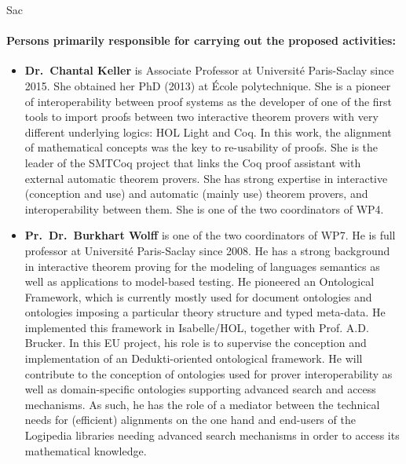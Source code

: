 \begin{sitedescription}{Sac}
\paragraph{Persons primarily responsible for carrying out the proposed
  activities:}

\begin{itemize} %

\item {\bf Dr.\ Chantal Keller} is Associate Professor at Université
  Paris-Saclay since 2015. She obtained her PhD (2013) at École
  polytechnique. She is a pioneer of interoperability between proof
  systems as the developer of one of the first tools to import proofs
  between two interactive theorem provers with very different underlying
  logics: HOL Light and Coq. In this work, the alignment of mathematical
  concepts was the key to re-usability of proofs. She is the leader of
  the SMTCoq project that links the Coq proof assistant with external
  automatic theorem provers. She has strong expertise in interactive
  (conception and use) and automatic (mainly use) theorem provers, and
  interoperability between them. She is one of the two coordinators of
  WP4.

\item {\bf Pr.\ Dr.\ Burkhart Wolff} is one of the two coordinators
  of WP7. He is full professor at Université Paris-Saclay since 2008.
  He has a strong background in interactive theorem proving for the modeling of 
  languages semantics as well as applications to model-based testing.
  He pioneered an Ontological Framework, which is currently mostly used for document
  ontologies and ontologies imposing a particular theory structure
  and typed meta-data. He implemented this framework in Isabelle/HOL, together
  with Prof. A.D. Brucker. In this EU project, his role is to supervise 
  the conception and implementation of an Dedukti-oriented ontological framework.
  He will contribute to the conception of ontologies used for prover interoperability
  as well as domain-specific ontologies supporting advanced search and access
  mechanisms. As such, he has the role of a mediator between the technical needs
  for (efficient) alignments on the one hand and end-users of the Logipedia
  libraries needing advanced search mechanisms in order to access its mathematical
  knowledge.

\end{itemize}

\end{sitedescription}


